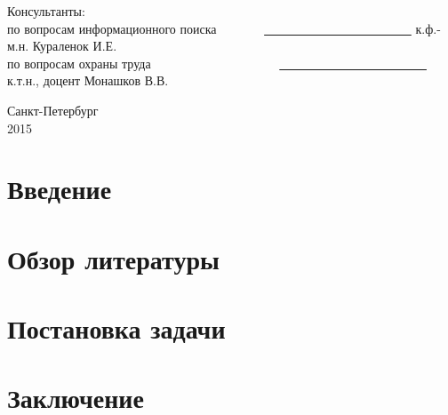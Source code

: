 \documentclass[12pt,a4paper]{report}
\renewcommand{\contentsname}{Содержание}
\begin{document}
\begin{titlepage}
\begin{center}
\vspace*{0.3cm}

\begin{flushleft}
Консультанты:\\
\vspace*{0.3cm}
по вопросам информационного поиска \ \ \ \ \ \ \ \underline{ \ \ \ \ \ \ \ \ \ \ \ \ \ \ \ \ \ \ \ \ \ \ \ } к.ф.-м.н. Кураленок И.Е.\\
\vspace*{0.3cm}
по вопросам охраны труда \ \ \ \ \ \ \ \ \ \ \ \ \ \ \ \ \ \ \ \ \underline{ \ \ \ \ \ \ \ \ \ \ \ \ \ \ \ \ \ \ \ \ \ \ \ } к.т.н., доцент Монашков В.В.
\end{flushleft}

\end{center}
\vfill
\begin{center}
{\large Санкт-Петербург \\ 2015}
\end {center}
\end{titlepage}


\topmargin -1cm
\hoffset -0.7in
\textwidth 6.0in
\textheight 9.0in
\parindent 1cm

\normalsize
{}
\setcounter{tocdepth}{4}

\renewcommand{\contentsname}{Содержание}
\tableofcontents

\chapter*{Введение}



\chapter{Обзор литературы}



\chapter{Постановка задачи}

\chapter*{Заключение}
\end{document}
